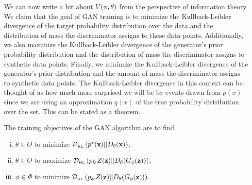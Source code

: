 We can now write a bit about $V(\phi, \theta)$ from the perspective of information
theory. We claim that the goal of GAN training is to minimize the
Kullback-Leibler divergence of the target probability distribution
over the data and the distribution of mass the discriminator assigns
to these data points.  Additionally, we also maximize the
Kullback-Leibler divergence of the generator's prior probability
distribution and the distribution of mass the discriminator assigns to
synthetic data points. Finally, we minimize the Kullback-Leibler
divergence of the generator's prior distribution and the amount of
mass the discriminator assigns to synthetic data points.  The
Kullback-Leibler divergence in this context can be thought of as how
much more surprised we will be by events drawn from $p(x)$ since we
are using an approximation $q(x)$ of the true probability distribution
over the set.  This can be stated as a theorem.

\begin{theorem}%
  \label{thm:info-objective}%
  The training objectives of the GAN algorithm are to find
  \begin{enumerate}[(i)]
  \item $\theta \in \Theta$ to minimize $\mathcal{D}_{\text{\tiny KL}}\left( p^*(\mathbf{x}) \middle| \middle| D_\theta(\mathbf{x}) \right)$;
  \item $\theta \in \Theta$ to maximize $\mathcal{D}_{\text{\tiny KL}}\left( p_\&Z(\mathbf{z}) \middle| \middle| D_\theta(G_\phi(\mathbf{z})) \right)$;
  \item $\phi \in \Phi$ to minimize $\mathcal{D}_{\text{\tiny KL}}\left( p_\&Z(\mathbf{z}) \middle| \middle| D_\theta(G_\phi(\mathbf{z})) \right)$.
  \end{enumerate}
\end{theorem}

